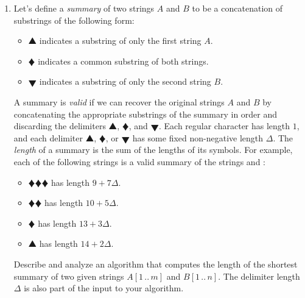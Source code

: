 \begin{enumerate}[label=\arabic*.,ref=\thechapter.\arabic*,leftmargin=*,align=left,widest*=99,itemsep=1.5ex plus 0.5ex]
\item Let’s define a \textit{summary} of two strings $A$ and $B$ to be a concatenation of substrings of the following form:
\begin{itemize}
\item {\color{JEcyan}$\bigblacktriangleup$} indicates a substring  of only the first string $A$.
\item $\vardiamondsuit$ indicates a common substring  of both strings.
\item {\color{JEred}$\bigblacktriangledown$} indicates a substring  of only the second string $B$.
\end{itemize}
A summary is \textit{valid} if we can recover the original strings $A$ and $B$ by concatenating the appropriate substrings of the summary in order and discarding the delimiters {\color{JEcyan}$\bigblacktriangleup$}, $\vardiamondsuit$, and {\color{JEred}$\bigblacktriangledown$}.
Each regular character has length $1$, and each delimiter {\color{JEcyan}$\bigblacktriangleup$}, $\vardiamondsuit$, or {\color{JEred}$\bigblacktriangledown$} has some fixed non-negative length $\Delta$.
The \textit{length} of a summary is the sum of the lengths of its symbols.
For example, each of the following strings is a valid summary of the strings  and :
\begin{itemize}
\item $\vardiamondsuit$$\vardiamondsuit$$\vardiamondsuit$ has length $9+7\Delta$.
\item $\vardiamondsuit$$\vardiamondsuit$ has length $10+5\Delta$.
\item $\vardiamondsuit$ has length $13+3\Delta$.
\item {\color{JEcyan}$\bigblacktriangleup$} has length $14+2\Delta$.
\end{itemize}
Describe and analyze an algorithm that computes the length of the shortest summary of two given strings $A[1\,..\,m]$ and $B[1\,..\,n]$.
The delimiter length $\Delta$ is also part of the input to your algorithm.

\end{enumerate}
